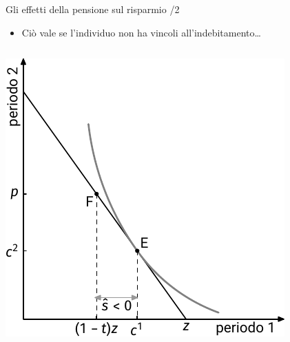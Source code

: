 \documentclass[11pt]{beamer}
\begin{document}
\begin{frame}{Gli effetti della pensione sul risparmio /2}
\begin{itemize}
\item Ciò vale se l'individuo non ha vincoli all'indebitamento\ldots{}
\end{itemize}


\begin{columns}
\begin{column}{.5\columnwidth}
\begin{center}
\includegraphics[width=\linewidth]{./figure/effetti-sul-risparmio-3.pdf}
\end{center}
\end{column}



\end{columns}
\end{frame}
\end{document}
